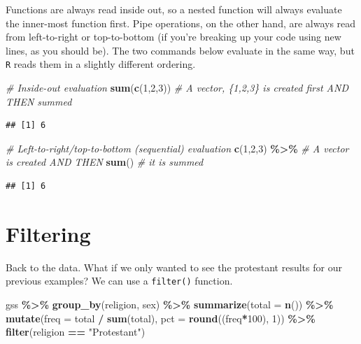 \documentclass[
]{book}
\newenvironment{Shaded}{\begin{snugshade}}{\end{snugshade}}
\newcommand{\AttributeTok}[1]{\textcolor[rgb]{0.13,0.29,0.53}{#1}}
\newcommand{\CommentTok}[1]{\textcolor[rgb]{0.56,0.35,0.01}{\textit{#1}}}
\newcommand{\DecValTok}[1]{\textcolor[rgb]{0.00,0.00,0.81}{#1}}
\newcommand{\FunctionTok}[1]{\textcolor[rgb]{0.13,0.29,0.53}{\textbf{#1}}}
\newcommand{\NormalTok}[1]{#1}
\newcommand{\SpecialCharTok}[1]{\textcolor[rgb]{0.81,0.36,0.00}{\textbf{#1}}}
\newcommand{\StringTok}[1]{\textcolor[rgb]{0.31,0.60,0.02}{#1}}
\begin{document}
Functions are always read inside out, so a nested function will always evaluate the inner-most function first. Pipe operations, on the other hand, are always read from left-to-right or top-to-bottom (if you're breaking up your code using new lines, as you should be). The two commands below evaluate in the same way, but \texttt{R} reads them in a slightly different ordering.

\begin{Shaded}
\begin{Highlighting}[]
\CommentTok{\# Inside{-}out evaluation}
\FunctionTok{sum}\NormalTok{(}\FunctionTok{c}\NormalTok{(}\DecValTok{1}\NormalTok{,}\DecValTok{2}\NormalTok{,}\DecValTok{3}\NormalTok{))               }\CommentTok{\# A vector, \{1,2,3\} is created first AND THEN summed}
\end{Highlighting}
\end{Shaded}

\begin{verbatim}
## [1] 6
\end{verbatim}

\begin{Shaded}
\begin{Highlighting}[]
\CommentTok{\# Left{-}to{-}right/top{-}to{-}bottom (sequential) evaluation}
\FunctionTok{c}\NormalTok{(}\DecValTok{1}\NormalTok{,}\DecValTok{2}\NormalTok{,}\DecValTok{3}\NormalTok{) }\SpecialCharTok{\%\textgreater{}\%}                \CommentTok{\# A vector is created AND THEN}
  \FunctionTok{sum}\NormalTok{()                     }\CommentTok{\# it is summed}
\end{Highlighting}
\end{Shaded}

\begin{verbatim}
## [1] 6
\end{verbatim}

\hypertarget{filtering}{%
\section{Filtering}\label{filtering}}

Back to the data. What if we only wanted to see the protestant results for our previous examples? We can use a \texttt{filter()} function.

\begin{Shaded}
\begin{Highlighting}[]
\NormalTok{gss }\SpecialCharTok{\%\textgreater{}\%}
  \FunctionTok{group\_by}\NormalTok{(religion, sex) }\SpecialCharTok{\%\textgreater{}\%}
  \FunctionTok{summarize}\NormalTok{(}\AttributeTok{total =} \FunctionTok{n}\NormalTok{()) }\SpecialCharTok{\%\textgreater{}\%}
  \FunctionTok{mutate}\NormalTok{(}\AttributeTok{freq =}\NormalTok{ total }\SpecialCharTok{/} \FunctionTok{sum}\NormalTok{(total),}
         \AttributeTok{pct =} \FunctionTok{round}\NormalTok{((freq}\SpecialCharTok{*}\DecValTok{100}\NormalTok{), }\DecValTok{1}\NormalTok{)) }\SpecialCharTok{\%\textgreater{}\%}
  \FunctionTok{filter}\NormalTok{(religion }\SpecialCharTok{==} \StringTok{"Protestant"}\NormalTok{)}
\end{Highlighting}
\end{Shaded}
\end{document}
